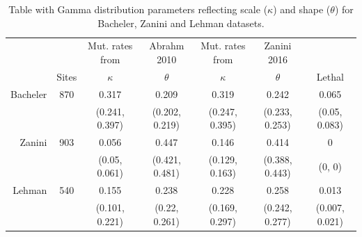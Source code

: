 \documentclass{article}
\begin{document}
\begin{table}[ht!]
\centering
\begin{tabular}{rc|cc|cc|c}
  \hline
  & & Mut. rates from  & Abrahm 2010 & Mut. rates from & Zanini 2016& \\
 & Sites & $\kappa$  & $\theta$ & $\kappa$ & $\theta$ & Lethal \\ 
  \hline
Bacheler & 870 & 0.317 & 0.209 & 0.319 & 0.242 & 0.065 \\ 
    &  & (0.241, 0.397) & (0.202, 0.219) & (0.247, 0.395) & (0.233, 0.253) & (0.05, 0.083) \\ 
  Zanini & 903 & 0.056 & 0.447 & 0.146 & 0.414 & 0 \\ 
     &  & (0.05, 0.061) & (0.421, 0.481) & (0.129, 0.163) & (0.388, 0.443) & (0, 0) \\ 
  Lehman & 540 & 0.155 & 0.238 & 0.228 & 0.258 & 0.013 \\ 
      &  & (0.101, 0.221) & (0.22, 0.261) & (0.169, 0.297) & (0.242, 0.277) & (0.007, 0.021) \\ 
   \hline
\end{tabular}
\label{TableGammaSupp}
\caption{Table with Gamma distribution parameters reflecting scale ($\kappa$) and shape ($\theta$) for Bacheler, Zanini and Lehman datasets.}
\end{table}
\end{document}
